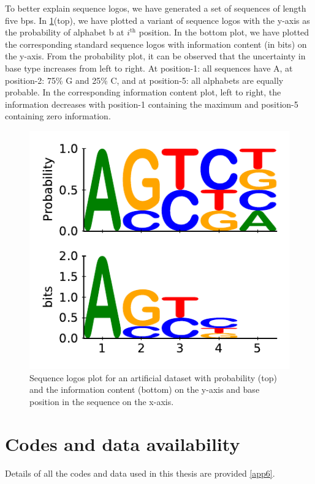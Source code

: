 To better explain sequence logos, we have generated a set of sequences of length five bps.
In \cref{c1:seq_logo_demo}(top), we have plotted a variant of sequence logos with the y-axis as the probability of alphabet b at $i^{\text{th}}$ position.
In the bottom plot, we have plotted the corresponding standard sequence logos with information content (in bits) on the y-axis. 
From the probability plot, it can be observed that the uncertainty in base type increases from left to right. 
At position-1: all sequences have A, at position-2: 75\% G and 25\% C, and at position-5: all alphabets are equally probable. 
In the corresponding information content plot, left to right, the information decreases with position-1 containing the maximum and position-5 containing zero information. 
\begin{figure}[htb]
	\begin{center}
	\centering\includegraphics[scale=0.8]{images/demo_seq_logo.pdf}
	\centering\caption{Sequence logos plot for an artificial dataset with probability (top) and the information content (bottom) on the y-axis and base position in the sequence on the x-axis.}
\label{c1:seq_logo_demo}
\end{center}
\end{figure}


\section{Codes and data availability}
Details of all the codes and data used in this thesis are provided \cref{app6}. 

